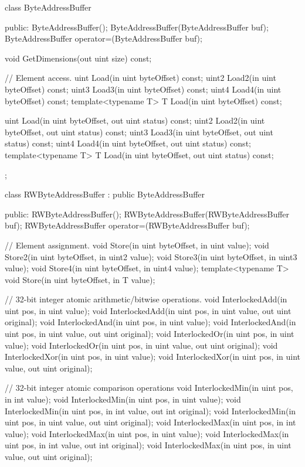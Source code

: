\begin{HLSL}
 class ByteAddressBuffer {
 public:
   ByteAddressBuffer();
   ByteAddressBuffer(ByteAddressBuffer buf);
   ByteAddressBuffer operator=(ByteAddressBuffer buf);

   void GetDimensions(out uint size) const;

   // Element access.
   uint Load(in uint byteOffset) const;
   uint2 Load2(in uint byteOffset) const;
   uint3 Load3(in uint byteOffset) const;
   uint4 Load4(in uint byteOffset) const;
   template<typename T>
   T Load(in uint byteOffset) const;

   uint Load(in uint byteOffset, out uint status) const;
   uint2 Load2(in uint byteOffset, out uint status) const;
   uint3 Load3(in uint byteOffset, out uint status) const;
   uint4 Load4(in uint byteOffset, out uint status) const;
   template<typename T>
   T Load(in uint byteOffset, out uint status) const;
};

 class RWByteAddressBuffer : public ByteAddressBuffer {
 public:
   RWByteAddressBuffer();
   RWByteAddressBuffer(RWByteAddressBuffer buf);
   RWByteAddressBuffer operator=(RWByteAddressBuffer buf);

   // Element assignment.
   void Store(in uint byteOffset, in uint value);
   void Store2(in uint byteOffset, in uint2 value);
   void Store3(in uint byteOffset, in uint3 value);
   void Store4(in uint byteOffset, in uint4 value);
   template<typename T>
   void Store(in uint byteOffset, in T value);

   // 32-bit integer atomic arithmetic/bitwise operations.
   void InterlockedAdd(in uint pos, in uint value);
   void InterlockedAdd(in uint pos, in uint value, out uint original);
   void InterlockedAnd(in uint pos, in uint value);
   void InterlockedAnd(in uint pos, in uint value, out uint original);
   void InterlockedOr(in uint pos, in uint value);
   void InterlockedOr(in uint pos, in uint value, out uint original);
   void InterlockedXor(in uint pos, in uint value);
   void InterlockedXor(in uint pos, in uint value, out uint original);

   // 32-bit integer atomic comparison operations
   void InterlockedMin(in uint pos, in int value);
   void InterlockedMin(in uint pos, in uint value);
   void InterlockedMin(in uint pos, in int value, out int original);
   void InterlockedMin(in uint pos, in uint value, out uint original);
   void InterlockedMax(in uint pos, in int value);
   void InterlockedMax(in uint pos, in uint value);
   void InterlockedMax(in uint pos, in int value, out int original);
   void InterlockedMax(in uint pos, in uint value, out uint original);

}
\end{HLSL}
